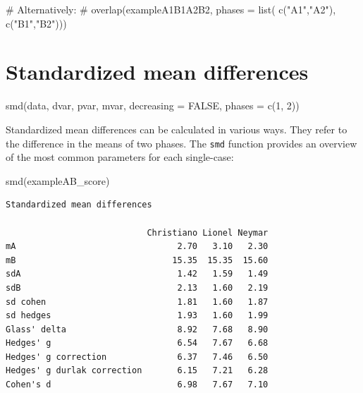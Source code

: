 \documentclass[
  letterpaper,
  DIV=11,
  numbers=noendperiod]{scrreprt}
\newenvironment{Shaded}{\begin{snugshade}}{\end{snugshade}}
\newcommand{\CommentTok}[1]{\textcolor[rgb]{0.37,0.37,0.37}{#1}}
\newcommand{\FunctionTok}[1]{\textcolor[rgb]{0.28,0.35,0.67}{#1}}
\newcommand{\NormalTok}[1]{\textcolor[rgb]{0.00,0.23,0.31}{#1}}
\begin{document}
\begin{Shaded}
\begin{Highlighting}[]
\CommentTok{\# Alternatively:}
\CommentTok{\# overlap(exampleA1B1A2B2, phases = list( c("A1","A2"), c("B1","B2")))}
\end{Highlighting}
\end{Shaded}

\hypertarget{standardized-mean-differences}{%
\section{Standardized mean
differences}\label{standardized-mean-differences}}

\begin{tcolorbox}[enhanced jigsaw, toprule=.15mm, colframe=quarto-callout-tip-color-frame, left=2mm, colback=white, breakable, bottomrule=.15mm, arc=.35mm, rightrule=.15mm, leftrule=.75mm, opacityback=0]
\begin{minipage}[t]{5.5mm}
\textcolor{quarto-callout-tip-color}{\faLightbulb}
\end{minipage}%
\begin{minipage}[t]{\textwidth - 5.5mm}
smd(data, dvar, pvar, mvar, decreasing = FALSE, phases = c(1,
2))\end{minipage}%
\end{tcolorbox}

Standardized mean differences can be calculated in various ways. They
refer to the difference in the means of two phases. The \texttt{smd}
function provides an overview of the most common parameters for each
single-case:

\begin{Shaded}
\begin{Highlighting}[]
\FunctionTok{smd}\NormalTok{(exampleAB\_score)}
\end{Highlighting}
\end{Shaded}

\begin{verbatim}
Standardized mean differences

                            Christiano Lionel Neymar
mA                                2.70   3.10   2.30
mB                               15.35  15.35  15.60
sdA                               1.42   1.59   1.49
sdB                               2.13   1.60   2.19
sd cohen                          1.81   1.60   1.87
sd hedges                         1.93   1.60   1.99
Glass' delta                      8.92   7.68   8.90
Hedges' g                         6.54   7.67   6.68
Hedges' g correction              6.37   7.46   6.50
Hedges' g durlak correction       6.15   7.21   6.28
Cohen's d                         6.98   7.67   7.10
\end{verbatim}
\end{document}
